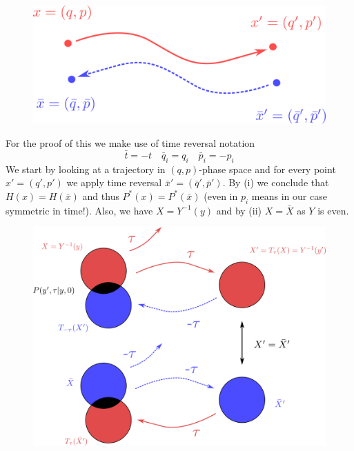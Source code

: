 \documentclass{notebook}
\begin{document}
%
\begin{figure}[H]
	\centering
	\includegraphics[width=0.7\linewidth]{Pics/timereversal}
	\label{fig:timereversal}
\end{figure}
%
For the proof of this we make use of time reversal notation
%
\begin{equation}
	\bar{t} = -t \quad \bar{q}_i = q_i \quad \bar{p}_i = -p_i
\end{equation}
%
We start by looking at a trajectory in $(q,p)$-phase space and for every point $x' = (q', p')$ we apply time reversal $\bar{x}' = (\bar{q}', \bar{p}')$. By (i) we conclude that $H(x) = H(\bar{x})$ and thus $P^*(x) = P^*(\bar{x})$ (even in $p_i$ means in our case symmetric in time!). Also, we have $X = Y^{-1}(y)$ and by (ii) $X = \bar{X}$ as $Y$ is even. 

\begin{figure}[H]
	\centering
	\includegraphics[width=0.9\linewidth]{Pics/detailedbalance}
	\label{fig:detailedbalance}
\end{figure}
\end{document}
